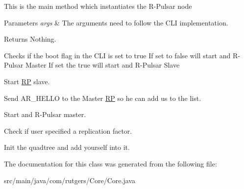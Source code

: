 This is the main method which instantiates the R-\/\+Pulsar node 
\begin{DoxyParams}{Parameters}
{\em args} & The arguments need to follow the C\+LI implementation. \\
\hline
\end{DoxyParams}
\begin{DoxyReturn}{Returns}
Nothing. 
\end{DoxyReturn}
Checks if the boot flag in the C\+LI is set to true If set to false will start and R-\/\+Pulsar Master If set the true will start and R-\/\+Pulsar Slave

Start \hyperlink{classcom_1_1rutgers_1_1Core_1_1RP}{RP} slave.

Send A\+R\+\_\+\+H\+E\+L\+LO to the Master \hyperlink{classcom_1_1rutgers_1_1Core_1_1RP}{RP} so he can add us to the list.

Start and R-\/\+Pulsar master.

Check if user specified a replication factor.

Init the quadtree and add yourself into it.

The documentation for this class was generated from the following file\+:\begin{DoxyCompactItemize}
\item 
src/main/java/com/rutgers/\+Core/Core.\+java\end{DoxyCompactItemize}
